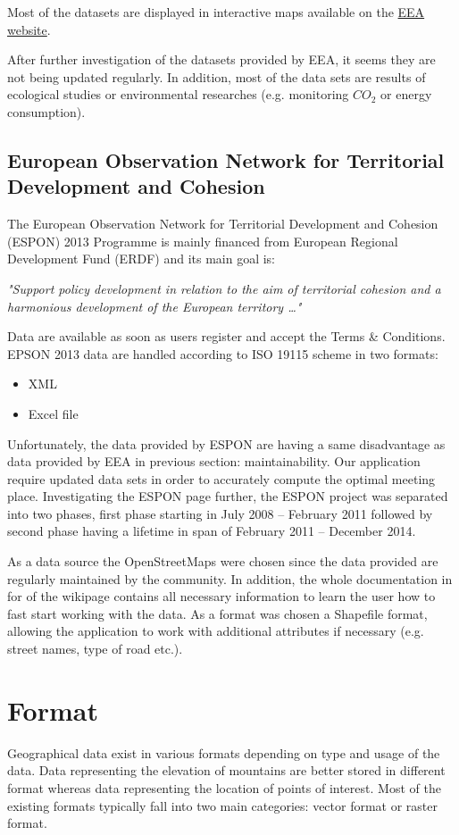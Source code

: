 \documentclass[thesis=M,english]{FITthesis}[2012/10/20]
\begin{document}
Most of the datasets are displayed in interactive maps available on the \href{http://www.eea.europa.eu/data-and-maps}{EEA website}.

After further investigation of the datasets provided by EEA, it seems they are not being updated regularly. In addition, most of the data sets are results of ecological studies or environmental researches (e.g. monitoring $CO_{2}$ or energy consumption).

\subsection{European Observation Network for Territorial Development and Cohesion}
The European Observation Network for Territorial Development and Cohesion (ESPON) 2013 Programme is mainly financed from European Regional Development Fund (ERDF) and its main goal is:

\textit{"Support policy development in relation to the aim of territorial cohesion and a harmonious development of the European territory \ldots "} \cite{ESPON13}

Data are available as soon as users register and accept the Terms \& Conditions. EPSON 2013 data are handled according to ISO 19115 scheme in two formats:

\begin{itemize}
\item XML
\item Excel file
\end{itemize}

Unfortunately, the data provided by ESPON are having a same disadvantage as data provided by EEA in previous section: maintainability. Our application require updated data sets in order to accurately compute the optimal meeting place. Investigating the ESPON page further, the ESPON project was separated into two phases, first phase starting in July 2008 -- February 2011 followed by second phase having a lifetime in span of February 2011 -- December 2014. 

As a data source the OpenStreetMaps were chosen since the data provided are regularly maintained by the community. In addition, the whole documentation in for of the wikipage contains all necessary information to learn the user how to fast start working with the data. As a format was chosen a Shapefile format, allowing the application to work with additional attributes if necessary (e.g. street names, type of road etc.).

\section{Format}
Geographical data exist in various formats depending on type and usage of the data. Data representing the elevation of mountains are better stored in different format whereas data representing the location of points of interest. 
Most of the existing formats typically fall into two main categories: vector format or raster format. 
\end{document}
